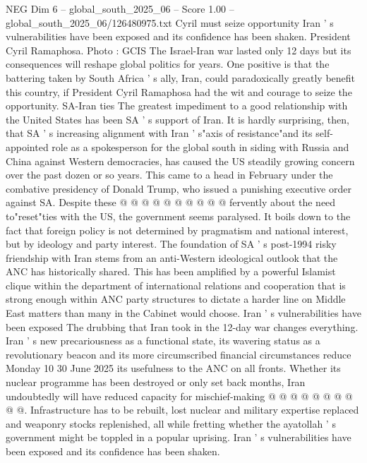 \begin{textsample}{NEG Dim 6 – global\_south\_2025\_06 – Score 1.00 – global\_south\_2025\_06/126480975.txt}  \label{ex:f6_neg_444}
Cyril must seize opportunity Iran ' s vulnerabilities have been exposed and its confidence has been shaken.
President Cyril Ramaphosa.
Photo : GCIS The Israel-Iran war lasted only 12 days but its consequences will reshape global politics for years.
One positive is that the battering taken by South Africa ' s ally, Iran, could paradoxically greatly benefit this country, if President Cyril Ramaphosa had the wit and courage to seize the opportunity.
SA-Iran ties The greatest impediment to a good relationship with the United States has been SA ' s support of Iran.
It is hardly surprising, then, that SA ' s increasing alignment with Iran ' s"axis of resistance"and its self-appointed role as a spokesperson for the global south in siding with Russia and China against Western democracies, has caused the US steadily growing concern over the past dozen or so years.
This came to a head in February under the combative presidency of Donald Trump, who issued a punishing executive order against SA.
Despite these @ @ @ @ @ @ @ @ @ @ fervently about the need to"reset"ties with the US, the government seems paralysed.
It boils down to the fact that foreign policy is not determined by pragmatism and national interest, but by ideology and party interest.
The foundation of SA ' s post-1994 risky friendship with Iran stems from an anti-Western ideological outlook that the ANC has historically shared.
This has been amplified by a powerful Islamist clique within the department of international relations and cooperation that is strong enough within ANC party structures to dictate a harder line on Middle East matters than many in the Cabinet would choose.
Iran ' s vulnerabilities have been exposed The drubbing that Iran took in the 12-day war changes everything.
Iran ' s new precariousness as a functional state, its wavering status as a revolutionary beacon and its more circumscribed financial circumstances reduce Monday 10 30 June 2025 its usefulness to the ANC on all fronts.
Whether its nuclear programme has been destroyed or only set back months, Iran undoubtedly will have reduced capacity for mischief-making @ @ @ @ @ @ @ @ @ @.
Infrastructure has to be rebuilt, lost nuclear and military expertise replaced and weaponry stocks replenished, all while fretting whether the ayatollah ' s government might be toppled in a popular uprising.
Iran ' s vulnerabilities have been exposed and its confidence has been shaken.

\end{textsample}
